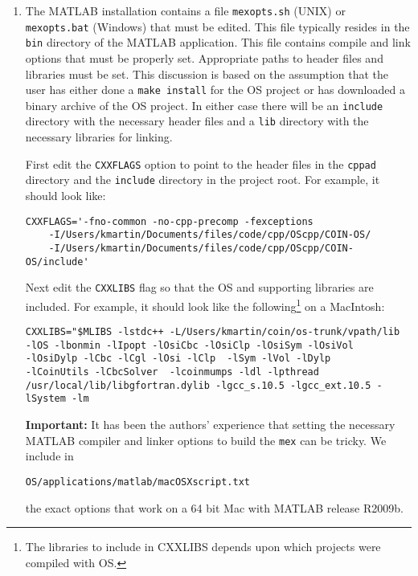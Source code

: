 \begin{enumerate}[{\bf Step 1:}]



\item{}   The MATLAB installation contains a file {\tt mexopts.sh} (UNIX) or {\tt mexopts.bat}  (Windows) that must be edited.   This file typically resides  in the {\tt bin} directory of the MATLAB application.    This file  contains compile and link options that must be properly set.   Appropriate paths to header files and libraries must be set.  This discussion is based on the assumption that the user has either done a  {\tt make install} for the OS project or has downloaded a binary archive of the OS project. In either case there will be an {\tt include} directory with the necessary header files and a {\tt lib} directory with the necessary libraries for linking. 

First edit   the {\tt CXXFLAGS} option  to point to  the header files in the {\tt cppad} directory and the {\tt include} directory in the project root. For example, it  should look like:
\begin{verbatim}
CXXFLAGS='-fno-common -no-cpp-precomp -fexceptions
    -I/Users/kmartin/Documents/files/code/cpp/OScpp/COIN-OS/
    -I/Users/kmartin/Documents/files/code/cpp/OScpp/COIN-OS/include'
\end{verbatim}

Next edit the {\tt CXXLIBS} flag so that the OS and supporting libraries are included. For example, it should look like the following\footnote{The libraries to include in CXXLIBS depends upon which projects were compiled with OS.} on a MacIntosh:

\begin{verbatim}
CXXLIBS="$MLIBS -lstdc++ -L/Users/kmartin/coin/os-trunk/vpath/lib 
-lOS -lbonmin -lIpopt -lOsiCbc -lOsiClp -lOsiSym -lOsiVol
-lOsiDylp -lCbc -lCgl -lOsi -lClp  -lSym -lVol -lDylp 
-lCoinUtils -lCbcSolver  -lcoinmumps -ldl -lpthread 
/usr/local/lib/libgfortran.dylib -lgcc_s.10.5 -lgcc_ext.10.5 -lSystem -lm 
\end{verbatim}

{\bf Important:} It has been the authors' experience that setting the necessary MATLAB compiler and linker options to build the {\tt mex} can be tricky.  We include in
\begin{verbatim}
OS/applications/matlab/macOSXscript.txt
\end{verbatim}
the exact options that work on a 64 bit Mac with MATLAB release R2009b.


\end{enumerate}

